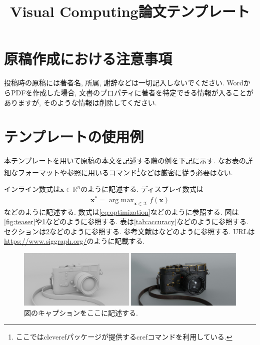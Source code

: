 \documentclass[anonymous]{vc}
\title{Visual Computing論文テンプレート}
\begin{document}
\maketitle


\section{原稿作成における注意事項}

投稿時の原稿には著者名, 所属, 謝辞などは一切記入しないでください.
WordからPDFを作成した場合, 文書のプロパティに著者を特定できる情報が入ることがありますが, そのような情報は削除してください.

\section{テンプレートの使用例}
\label{sec:template}

本テンプレートを用いて原稿の本文を記述する際の例を下記に示す.
なお表の詳細なフォーマットや参照に用いるコマンド\footnote{ここでは\textsf{cleveref}パッケージが提供する\textsf{cref}コマンド\cite{Wikibooks:LaTeX:Ref}を利用している.}などは厳密に従う必要はない.

インライン数式は$\mathbf{x} \in \mathbb{R}^{n}$のように記述する.
ディスプレイ数式は
\begin{align}
  \mathbf{x}^{*} = \mathop{\text{arg max}}_{\mathbf{x} \in \mathcal{X}} f(\mathbf{x})
  \label{eq:optimization}
\end{align}
などのように記述する.
数式は\cref{eq:optimization}などのように参照する.
図は\cref{fig:teaser}や\cref{fig:leica}などのように参照する.
表は\cref{tab:accuracy}などのように参照する.
セクションは\cref{sec:template}などのように参照する.
参考文献は\cite{GSC12,WL00}などのように参照する.
URLは\url{https://www.siggraph.org/}のように記載する.

\begin{figure}
  \centering
  \includegraphics[width=\columnwidth]{./figures/leica.pdf}
  \caption{図のキャプションをここに記述する.}
  \label{fig:leica}
\end{figure}
\end{document}
